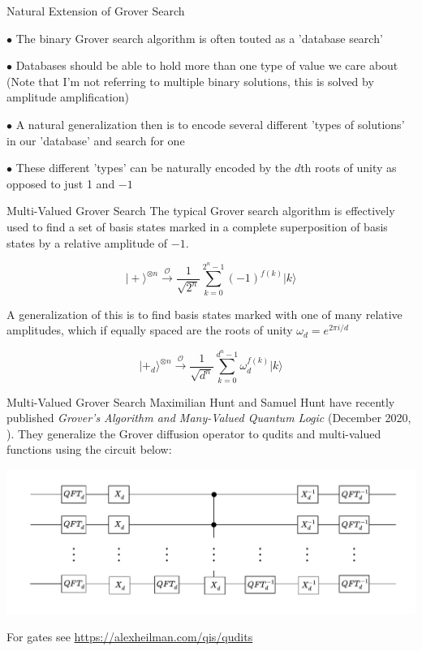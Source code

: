 \documentclass[xcolor=dvipsnames]{beamer}
\begin{document}
\begin{frame}{Natural Extension of Grover Search}

$\bullet$ The binary Grover search algorithm is often touted as a 'database search'\pause

\vspace{.25cm}

$\bullet$ Databases should be able to hold more than one type of value we care about \pause (Note that I'm not referring to multiple binary solutions, this is solved by amplitude amplification)\pause

\vspace{.25cm}

$\bullet$ A natural generalization then is to encode several different 'types of solutions' in our 'database' and search for one\pause

\vspace{.25cm}

$\bullet$ These different 'types' can be naturally encoded by the $d$th roots of unity as opposed to just 1 and $-1$

\end{frame}


\begin{frame}{Multi-Valued Grover Search}
The typical Grover search algorithm is effectively used to find a 
set of basis states marked in a complete superposition of basis states by a relative amplitude of $-1$.

\pause

$$\vert + \rangle^{\otimes n} \xrightarrow{\mathcal{O}} \frac{1}{\sqrt{2^n}}\sum_{k=0}^{2^n-1}(-1)^{f(k)}\vert k\rangle$$\pause

A generalization of this is to find basis states marked with one of many relative amplitudes, which if 
equally spaced are the roots of unity $\omega_d=e^{2\pi i/d}$\pause

$$\vert +_d \rangle^{\otimes n} \xrightarrow{\mathcal{O}} \frac{1}{\sqrt{d^n}}\sum_{k=0}^{d^n-1}\omega_d^{f(k)}\vert k\rangle$$

\end{frame}



\begin{frame}{Multi-Valued Grover Search}
Maximilian Hunt and Samuel Hunt have recently published \textit{Grover’s Algorithm and Many-Valued Quantum Logic
}(December 2020, \cite{hunt2020}). \pause They generalize the Grover diffusion operator to qudits and multi-valued functions using the circuit below:

\includegraphics[scale=.45]{GGDO.pdf}

For gates see \url{https://alexheilman.com/qis/qudits}
\end{frame}
\end{document}
